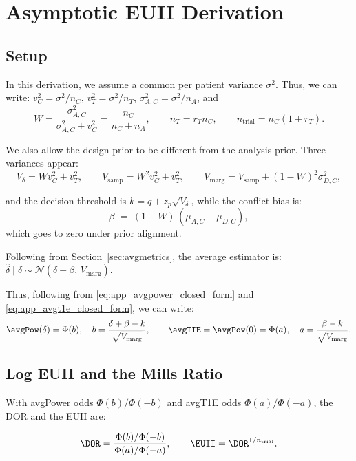 \chapter{Asymptotic EUII Derivation}
\label{sec:app_asymptotic}

\section{Setup}
In this derivation, we assume a common per patient variance $\sigma^2$. Thus, we can write: 
$v_C^2=\sigma^2/n_C$, $v_T^2=\sigma^2/n_T$, $\sigma_{A,C}^2=\sigma^2/n_A$, and 
\[
  W=\frac{\sigma_{A,C}^2}{\sigma_{A,C}^2+v_C^2}=\frac{n_C}{n_C+n_A},\qquad
  n_T=r_T n_C,\qquad n_{\text{trial}}=n_C(1+r_T).
\]

We also allow the design prior to be different from the analysis prior.
Three variances appear: 
\begin{equation}\label{eq:vars}
  V_\delta = W v_C^2 + v_T^2,\qquad
  V_{\text{samp}} = W^2 v_C^2 + v_T^2,\qquad
  V_{\text{marg}} = V_{\text{samp}} + (1-W)^2\sigma_{D,C}^2,
\end{equation}

and the decision threshold is $k=q+z_p\sqrt{V_\delta}$, while the conflict bias is:
\begin{equation}\label{eq:bias}
  \beta \;=\; (1-W)\,(\mu_{A,C}-\mu_{D,C}),
\end{equation}
which goes to zero under prior alignment.

Following from Section~\ref{sec:avgmetrics}, the average estimator is:
$\hat\delta \mid \delta \sim\mathcal N(\delta+\beta,\,V_{\text{marg}})$.

Thus, following from \eqref{eq:app_avgpower_closed_form} and \eqref{eq:app_avgt1e_closed_form}, we can write:
\begin{equation}\label{eq:avg}
  \avgPow(\delta)=\Phi(b),\quad b=\frac{\delta+\beta-k}{\sqrt{V_{\text{marg}}}},\qquad
  \avgTIE=\avgPow(0)=\Phi(a),\quad a=\frac{\beta-k}{\sqrt{V_{\text{marg}}}} .
\end{equation}


\section{Log EUII and the Mills Ratio}
With avgPower odds $\Phi(b)/\Phi(-b)$ and avgT1E odds $\Phi(a)/\Phi(-a)$, the DOR and the EUII are:

\[
  \DOR=\frac{\Phi(b)/\Phi(-b)}{\Phi(a)/\Phi(-a)},\qquad
  \EUII=\DOR^{1/n_{\text{trial}}} .
\]

